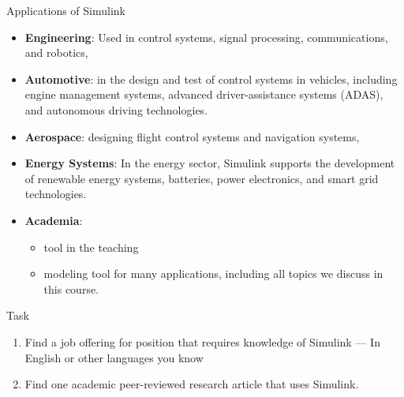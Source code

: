 \begin{frame}{Applications of Simulink}
  \begin{itemize}
    \item \textbf{Engineering}: Used  in control systems, signal processing, communications, and robotics,
    \item \textbf{Automotive}:  in the design and test of control systems in vehicles, including engine management systems, advanced driver-assistance systems (ADAS), and autonomous driving technologies.
    \item \textbf{Aerospace}: designing flight control systems and navigation systems,
    \item \textbf{Energy Systems}: In the energy sector, Simulink supports the development of renewable energy systems, batteries, power electronics, and smart grid technologies.
    \item \textbf{Academia}: 
    \begin{itemize}
        \item tool in the teaching 
        \item modeling tool for many applications, including all topics we discuss in this course.
    \end{itemize}
  \end{itemize}
\end{frame}

\begin{frame}{Task}
    \Large
    \begin{enumerate}
        \item Find a job offering for position that requires knowledge of Simulink --- In English or other languages you know
        \item Find one academic peer-reviewed research article that uses Simulink. 
    \end{enumerate}
     
\end{frame}


